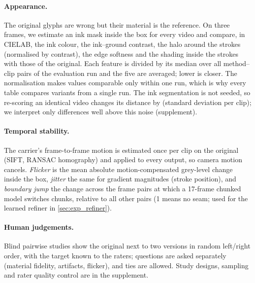 \paragraph{Appearance.} The original glyphs are wrong but their material is the reference. On three frames, we estimate an ink mask inside the box for every video and compare, in CIELAB, the ink colour, the ink--ground contrast, the halo around the strokes (normalised by contrast), the edge softness and the shading inside the strokes with those of the original. Each feature is divided by its median over all method--clip pairs of the evaluation run and the five are averaged; lower is closer. The normalisation makes values comparable only within one run, which is why every table compares variants from a single run. The ink segmentation is not seeded, so re-scoring an identical video changes its distance by \rRetestSD{} (standard deviation per clip); we interpret only differences well above this noise (supplement).

\paragraph{Temporal stability.} The carrier's frame-to-frame motion is estimated once per clip on the original (SIFT, RANSAC homography) and applied to every output, so camera motion cancels. \emph{Flicker} is the mean absolute motion-compensated grey-level change inside the box, \emph{jitter} the same for gradient magnitudes (stroke position), and \emph{boundary jump} the change across the frame pairs at which a 17-frame chunked model switches chunks, relative to all other pairs (1 means no seam; used for the learned refiner in \cref{sec:exp_refiner}).

\paragraph{Human judgements.} Blind pairwise studies show the original next to two versions in random left/right order, with the target known to the raters; questions are asked separately (\eg material fidelity, artifacts, flicker), and ties are allowed. Study designs, sampling and rater quality control are in the supplement.
